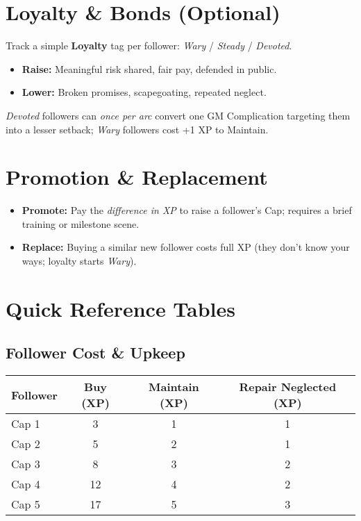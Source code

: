 \documentclass[12pt]{article}
\begin{document}
\section{Loyalty \& Bonds (Optional)}
Track a simple \textbf{Loyalty} tag per follower: \emph{Wary} / \emph{Steady} / \emph{Devoted}. 
\begin{itemize}
  \item \textbf{Raise:} Meaningful risk shared, fair pay, defended in public.
  \item \textbf{Lower:} Broken promises, scapegoating, repeated neglect.
\end{itemize}
\textit{Devoted} followers can \emph{once per arc} convert one GM Complication targeting them into a lesser setback; \textit{Wary} followers cost +1 XP to Maintain.

\section{Promotion \& Replacement}
\begin{itemize}
  \item \textbf{Promote:} Pay the \emph{difference in XP} to raise a follower’s Cap; requires a brief training or milestone scene.
  \item \textbf{Replace:} Buying a similar new follower costs full XP (they don’t know your ways; loyalty starts \emph{Wary}).
\end{itemize}

\section{Quick Reference Tables}

\subsection*{Follower Cost \& Upkeep}
\begin{center}
\begin{tabular}{lccc}
\toprule
\textbf{Follower} & \textbf{Buy (XP)} & \textbf{Maintain (XP)} & \textbf{Repair Neglected (XP)} \\
\midrule
Cap 1 & 3 & 1 & 1 \\
Cap 2 & 5 & 2 & 1 \\
Cap 3 & 8 & 3 & 2 \\
Cap 4 & 12 & 4 & 2 \\
Cap 5 & 17 & 5 & 3 \\
\bottomrule
\end{tabular}
\end{center}
\end{document}
